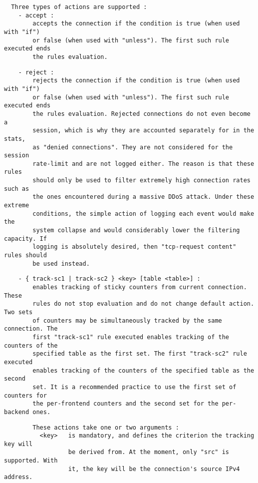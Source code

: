 \begin{verbatim}
  Three types of actions are supported :
    - accept :
        accepts the connection if the condition is true (when used with "if")
        or false (when used with "unless"). The first such rule executed ends
        the rules evaluation.
\end{verbatim}

\begin{verbatim}
    - reject :
        rejects the connection if the condition is true (when used with "if")
        or false (when used with "unless"). The first such rule executed ends
        the rules evaluation. Rejected connections do not even become a
        session, which is why they are accounted separately for in the stats,
        as "denied connections". They are not considered for the session
        rate-limit and are not logged either. The reason is that these rules
        should only be used to filter extremely high connection rates such as
        the ones encountered during a massive DDoS attack. Under these extreme
        conditions, the simple action of logging each event would make the
        system collapse and would considerably lower the filtering capacity. If
        logging is absolutely desired, then "tcp-request content" rules should
        be used instead.
\end{verbatim}

\begin{verbatim}
    - { track-sc1 | track-sc2 } <key> [table <table>] :
        enables tracking of sticky counters from current connection. These
        rules do not stop evaluation and do not change default action. Two sets
        of counters may be simultaneously tracked by the same connection. The
        first "track-sc1" rule executed enables tracking of the counters of the
        specified table as the first set. The first "track-sc2" rule executed
        enables tracking of the counters of the specified table as the second
        set. It is a recommended practice to use the first set of counters for
        the per-frontend counters and the second set for the per-backend ones.
\end{verbatim}

\begin{verbatim}
        These actions take one or two arguments :
          <key>   is mandatory, and defines the criterion the tracking key will
                  be derived from. At the moment, only "src" is supported. With
                  it, the key will be the connection's source IPv4 address.
\end{verbatim}


